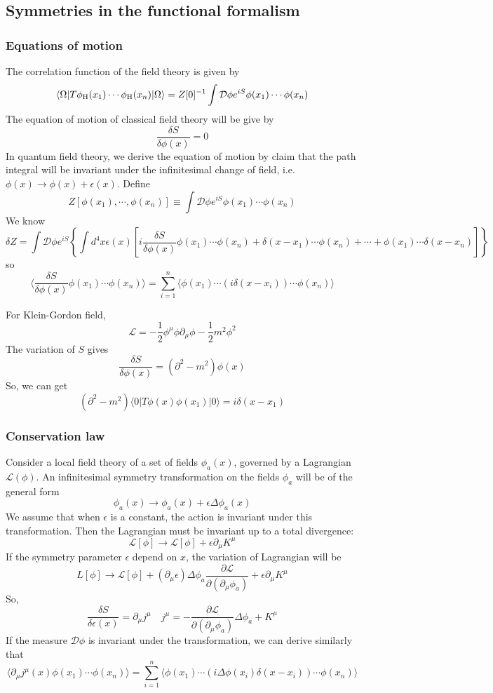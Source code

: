 \subsection{Symmetries in the functional formalism}
\subsubsection{Equations of motion}
\noindent
The correlation function of the field theory is given by
\[\langle \Omega | T \phi_{\rm H}(x_1) \cdots \phi_{\rm H}(x_n) | \Omega \rangle = Z[0]^{-1} \int \mathcal{D}\phi e^{iS} \phi(x_1)\cdots\phi(x_n)\]
The equation of motion of classical field theory will be give by
\[\frac{\delta S}{\delta \phi(x)} = 0\]
In quantum field theory, we derive the equation of motion by claim that the path integral will be invariant under the infinitesimal change of field, i.e. $\phi(x) \to \phi(x) + \epsilon(x)$.
Define
\[Z[\phi(x_1),\cdots,\phi(x_n)] \equiv  \int \mathcal{D}\phi e^{iS} \phi(x_1)\cdots\phi(x_n)\]
We know
\[\delta Z = \int \mathcal{D}\phi e^{iS} \left\{ \int d^4x \epsilon(x) \left[ i\frac{\delta S}{\delta \phi(x)} \phi(x_1)\cdots\phi(x_n) + \delta(x-x_1)\cdots\phi(x_n) + \cdots + \phi(x_1)\cdots\delta(x-x_n) \right]\right\} \]
so
\[\langle \frac{\delta S}{\delta \phi(x)} \phi(x_1)\cdots\phi(x_n) \rangle  = \sum_{i=1}^{n} \langle \phi(x_1) \cdots (i\delta(x-x_i)) \cdots \phi(x_n) \rangle\]
\begin{example}
For Klein-Gordon field,
\[\mathcal{L} = -\frac{1}{2}\phi^{\mu}\phi \partial_{\mu}\phi - \frac{1}{2}m^2\phi^2\]
The variation of $S$ gives
\[\frac{\delta S}{\delta \phi(x)} = (\partial^2-m^2)\phi(x)\]
So, we can get
\[(\partial^2-m^2) \langle 0 | T \phi(x)\phi(x_1)| 0 \rangle = i\delta(x-x_1)\]
\end{example}

\subsubsection{Conservation law}
Consider a local field theory of a set of fields $\phi_a(x)$, governed by a Lagrangian $\mathcal{L}(\phi)$. An infinitesimal symmetry transformation on the fields $\phi_a$ will be of the general form 
\[\phi_a(x) \to \phi_a(x) + \epsilon \Delta \phi_a(x)\]
We assume that when $\epsilon$ is a constant, the action is invariant under this transformation. Then the Lagrangian must be invariant up to a total divergence:
\[\mathcal{L}[\phi] \to \mathcal{L}[\phi] + \epsilon \partial_{\mu} K^{\mu}\]
If the symmetry parameter $\epsilon$ depend on $x$, the variation of Lagrangian will be
\[L[\phi] \to \mathcal{L}[\phi] + (\partial_{\mu}\epsilon)\Delta \phi_a \frac{\partial \mathcal{L}}{\partial (\partial_{\mu}\phi_a)} + \epsilon \partial_{\mu} K^{\mu}\]
So, 
\[\frac{\delta S}{\delta \epsilon(x)} = \partial_{\mu} j^{\mu} \quad j^{\mu} = -\frac{\partial \mathcal{L}}{\partial (\partial_{\mu}\phi_a)}\Delta \phi_a + K^{\mu} \]
If the measure $\mathcal{D}\phi$ is invariant under the transformation, we can derive similarly that
\[\langle \partial_{\mu} j^{\mu}(x) \phi(x_1)\cdots\phi(x_n) \rangle  = \sum_{i=1}^{n} \langle \phi(x_1) \cdots (i\Delta \phi(x_i)\delta(x-x_i)) \cdots \phi(x_n) \rangle\]

